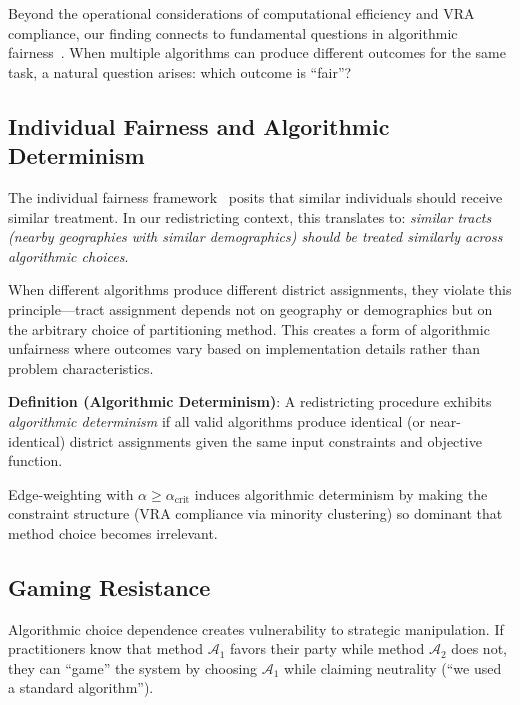 
Beyond the operational considerations of computational efficiency and VRA compliance, our finding connects to fundamental questions in algorithmic fairness~\cite{dwork2012fairness,hardt2016equality}. When multiple algorithms can produce different outcomes for the same task, a natural question arises: which outcome is ``fair''?

\subsection{Individual Fairness and Algorithmic Determinism}

The individual fairness framework~\cite{dwork2012fairness} posits that similar individuals should receive similar treatment. In our redistricting context, this translates to: \textit{similar tracts (nearby geographies with similar demographics) should be treated similarly across algorithmic choices}.

When different algorithms produce different district assignments, they violate this principle---tract assignment depends not on geography or demographics but on the arbitrary choice of partitioning method. This creates a form of algorithmic unfairness where outcomes vary based on implementation details rather than problem characteristics.

\textbf{Definition (Algorithmic Determinism)}: A redistricting procedure exhibits \textit{algorithmic determinism} if all valid algorithms produce identical (or near-identical) district assignments given the same input constraints and objective function.

Edge-weighting with $\alpha \geq \alpha_{\text{crit}}$ induces algorithmic determinism by making the constraint structure (VRA compliance via minority clustering) so dominant that method choice becomes irrelevant.

\subsection{Gaming Resistance}

Algorithmic choice dependence creates vulnerability to strategic manipulation. If practitioners know that method $\mathcal{A}_1$ favors their party while method $\mathcal{A}_2$ does not, they can ``game'' the system by choosing $\mathcal{A}_1$ while claiming neutrality (``we used a standard algorithm'').


